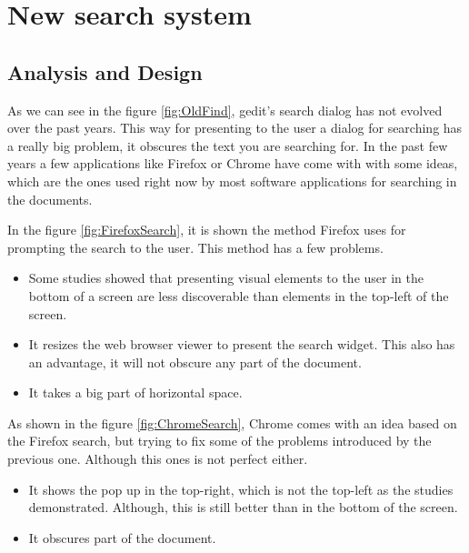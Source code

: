 
\chapter{New search system}

\section{Analysis and Design}


As we can see in the figure \ref{fig:OldFind}, gedit's search dialog has not evolved over the past years. This way for presenting to the user a dialog for searching has a really big problem, it obscures the text you are searching for. In the past few years a few applications like Firefox or Chrome have come with with some ideas, which are the ones used right now by most software applications for searching in the documents.

In the figure \ref{fig:FirefoxSearch}, it is shown the method Firefox uses for prompting the search to the user. This method has a few problems.
\begin{itemize}
  \item Some studies showed that presenting visual elements to the user in the bottom of a screen are less discoverable than elements in the top-left of the screen.
  \item It resizes the web browser viewer to present the search widget. This also has an advantage, it will not obscure any part of the document.
  \item It takes a big part of horizontal space.
\end{itemize}


As shown in the figure \ref{fig:ChromeSearch}, Chrome comes with an idea based on the Firefox search, but trying to fix some of the problems introduced by the previous one. Although this ones is not perfect either.
\begin{itemize}
  \item It shows the pop up in the top-right, which is not the top-left as the studies demonstrated. Although, this is still better than in the bottom of the screen.
  \item It obscures part of the document.
\end{itemize}

